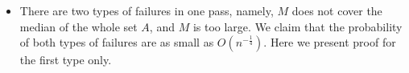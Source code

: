 \documentclass[mathserif]{beamer}
\begin{document}
{\begin{figure}
\begin{tikzpicture}[scale=0.9, auto,swap]
%
%
%    
% 
%
%
%
%
%
%

    
   \end{tikzpicture}
\end{figure}

\begin{itemize}
	\item There are two types of failures in one pass, namely, $M$ does not cover the median of the whole set $A$, and $M$ is too large.  We claim that the probability of both types of failures are as small as $O(n^{-\frac{1}{4}})$. Here we present proof for the first type only. 
\end{itemize}

} 
\end{document}
